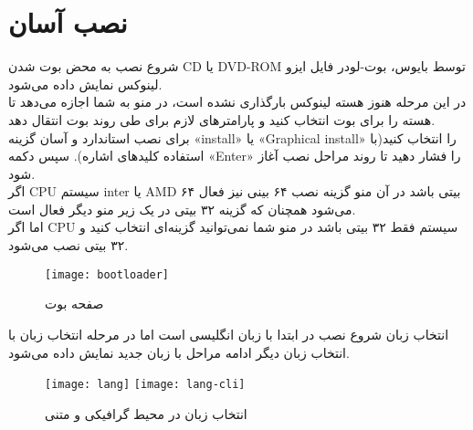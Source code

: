 \section{نصب آسان}
\begin{frame}{شروع نصب}
  به محض بوت شدن CD یا DVD-ROM توسط بایوس، بوت-لودر فایل ایزو لینوکس نمایش داده می‌شود.\\
  در این مرحله هنوز هسته لینوکس بارگذاری نشده است، در منو به شما اجازه می‌دهد تا هسته را برای بوت انتخاب کنید و پارامترهای لازم برای طی روند بوت انتقال دهد.\\
  برای نصب استاندارد و آسان گزینه «install» یا «Graphical install» را انتخاب کنید(با استفاده کلید‌های اشاره). سپس دکمه «Enter» را فشار دهید تا روند مراحل نصب آغاز شود.\\
  اگر CPU سیستم inter یا AMD ۶۴ بیتی باشد در آن منو گزینه نصب ۶۴ بینی نیز فعال می‌شود همچنان که گزینه ۳۲ بیتی در یک زیر منو دیگر فعال است.\\
  اما اگر CPU سیستم فقط ۳۲ بیتی باشد در منو شما نمی‌توانید گزینه‌ای انتخاب کنید و ۳۲ بیتی نصب می‌شود.\\
\begin{figure}
    \centering
    \texttt{[image: bootloader]}
    \caption{صفحه بوت~\cite{fig:deb_bootscreen}}
\end{figure}
\end{frame}
\begin{frame}{انتخاب زبان}
  شروع نصب در ابتدا با زبان انگلیسی است اما در مرحله انتخاب زبان با انتخاب زبان دیگر ادامه مراحل با زبان جدید نمایش داده می‌شود.\\
  \begin{figure}
    \texttt{[image: lang]}
    \texttt{[image: lang-cli]}
    \caption{انتخاب زبان در محیط گرافیکی و متنی~\cite{fig:deb_lang_gui}}
  \end{figure}
\end{frame}
